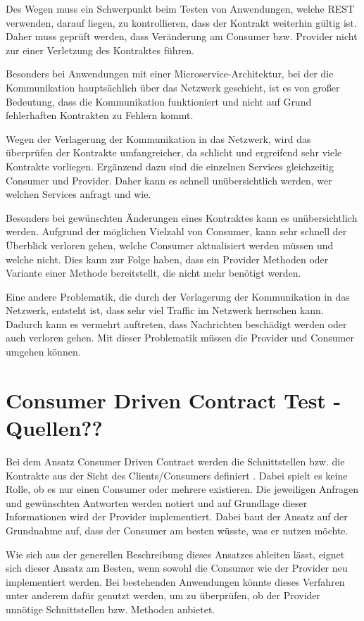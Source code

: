 \documentclass{llncs}
\begin{document}
Des Wegen muss ein Schwerpunkt beim Testen von Anwendungen, welche REST verwenden, darauf liegen, zu kontrollieren, dass der Kontrakt weiterhin gültig ist. Daher muss geprüft werden, dass Veränderung am Consumer bzw. Provider nicht zur einer Verletzung des Kontraktes führen.

Besonders bei Anwendungen mit einer Microservice-Architektur, bei der die Kommunikation hauptsächlich über das Netzwerk geschieht, ist es von großer Bedeutung, dass die Kommunikation funktioniert und nicht auf Grund fehlerhaften Kontrakten zu Fehlern kommt.

Wegen der Verlagerung der Kommunikation in das Netzwerk, wird das überprüfen der Kontrakte umfangreicher, da schlicht und ergreifend sehr viele Kontrakte vorliegen. Ergänzend dazu sind die einzelnen Services gleichzeitig Consumer und Provider. Daher kann es schnell unübersichtlich werden, wer welchen Services anfragt und wie.

Besonders bei gewünschten Änderungen eines Kontraktes kann es unübersichtlich werden. Aufgrund der möglichen Vielzahl von Consumer, kann  sehr schnell der Überblick verloren gehen, welche Consumer aktualisiert werden müssen und welche nicht. Dies kann zur Folge haben, dass ein Provider Methoden oder Variante einer Methode bereitstellt, die nicht mehr benötigt werden.

Eine andere Problematik, die durch der Verlagerung der Kommunikation in das Netzwerk, entsteht ist, dass sehr viel Traffic im Netzwerk herrschen kann. Dadurch kann es vermehrt auftreten, dass Nachrichten beschädigt werden oder auch verloren gehen. Mit dieser Problematik müssen die Provider und Consumer umgehen können.

\section{Consumer Driven Contract Test - Quellen??}
Bei dem Ansatz Consumer Driven Contract werden die Schnittstellen bzw. die Kontrakte aus der Sicht des Clients/Consumers definiert \cite{Robinson2006}. Dabei spielt es keine Rolle, ob es nur einen Consumer oder mehrere existieren. Die jeweiligen Anfragen und gewünschten Antworten werden notiert und auf Grundlage dieser Informationen wird der Provider implementiert. Dabei baut der Ansatz auf der Grundnahme auf, dass der Consumer am besten wüsste, was er nutzen möchte.

Wie sich aus der generellen Beschreibung dieses Ansatzes ableiten lässt, eignet sich dieser Ansatz am Besten, wenn sowohl die Consumer wie der Provider neu implementiert werden. Bei bestehenden Anwendungen könnte dieses Verfahren unter anderem dafür genutzt werden, um zu überprüfen, ob der Provider unnötige Schnittstellen bzw. Methoden anbietet.
\end{document}
